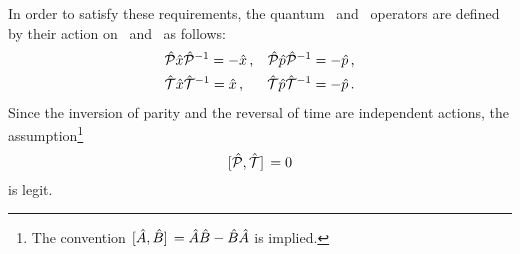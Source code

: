         In order to satisfy these requirements, the quantum \hP\ and \hT\ operators are defined by their action on \hx\ and \hp\ as follows:
        \begin{align}
            \label{eq:quantum-P}
            &\mathcal{\hat{P}}\hat{x}\mathcal{\hat{P}}^{-1} = -\hat{x}
            \,\text{,}
            &\mathcal{\hat{P}}\hat{p}\mathcal{\hat{P}}^{-1} = -\hat{p}
            \,\text{,}
            \\
            \label{eq:quantum-T}
            &\mathcal{\hat{T}}\hat{x}\mathcal{\hat{T}}^{-1} = \hat{x}
            \,\text{,}
            &\mathcal{\hat{T}}\hat{p}\mathcal{\hat{T}}^{-1} = -\hat{p}
            \,\text{.}
        \end{align}
        Since the inversion of parity and the reversal of time are independent actions, the assumption\footnote{The convention $\comm*{\togglehat{A}}{\togglehat{B}} = \togglehat{A}\togglehat{B} - \togglehat{B}\togglehat{A}$ is implied.}
        \begin{equation}
            \label{eq:PT-commutator}
            \comm*{\hP}{\hT} = 0 
        \end{equation}
        is legit.

